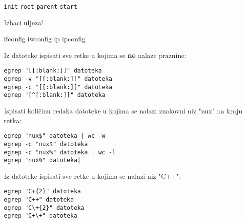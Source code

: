 \documentclass[a4paper,11pt]{exam}
\newcommand{\shell}[1]{\texttt{#1}}
\begin{document}
\begin{questions}
	\begin{oneparchoices}
		\CorrectChoice \shell{init} 
		\choice \shell{root}  
		\choice \shell{parent} 
		\choice \shell{start}
	\end{oneparchoices}
	
	\question
	Izbaci uljeza!
	
	\begin{oneparchoices}
		\choice ifconfig
		\choice iwconfig
		\choice ip
		\CorrectChoice ipconfig
	\end{oneparchoices}


\vspace{1em}


	\question
	Iz datoteke ispisati sve retke u kojima se \textbf{ne} nalaze praznine:
	
	\begin{oneparchoices}
		\choice \shell{egrep "[[:blank:]]" datoteka} \\
		\CorrectChoice \shell{egrep -v "[[:blank:]]" datoteka} \\
		\choice \shell{egrep -c "[[:blank:]]" datoteka} \\
		\choice \shell{egrep "[\textasciicircum[:blank:]]" datoteka} \\
	\end{oneparchoices}
	
	\question
	Ispisati količinu redaka datoteke u kojima se nalazi znakovni niz "nux" na kraju retka: 
	
	\begin{oneparchoices}
		\choice \shell{egrep "nux\$" datoteka | wc -w} \\
		\CorrectChoice \shell{egrep -c "nux\$" datoteka} \\
		\choice \shell{egrep -c "nux\%" datoteka | wc -l} \\
		\choice \shell{egrep "nux\%" datoteka|} 
	\end{oneparchoices}
	
	\question
	Iz datoteke ispisati sve retke u kojima se nalazi niz "C++":
	
	\begin{oneparchoices}
		\choice \verb|egrep "C+{2}" datoteka| \\
		\choice \verb|egrep "C++" datoteka| \\
		\CorrectChoice \verb|egrep "C\+{2}" datoteka| \\
		\choice \verb|egrep "C+\+" datoteka|
	\end{oneparchoices}
	

\end{questions}
\end{document}
